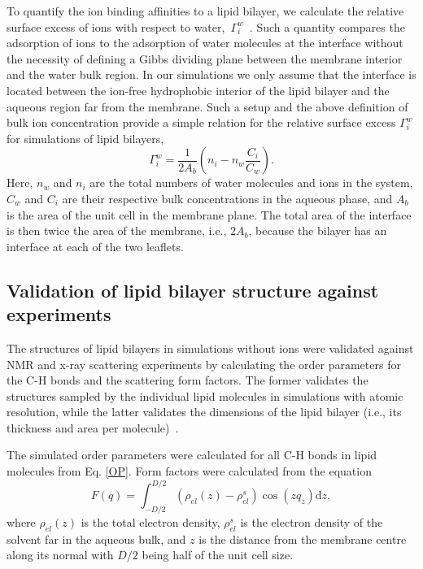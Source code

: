 \documentclass[aip,jcp,twocolumn]{revtex4}
\begin{document}
To quantify the ion binding affinities to a lipid bilayer, we
calculate the relative surface excess of ions with respect to water,~$\Gamma_i^w$~\cite{chattorajBOOK}.
Such a quantity compares the adsorption of ions to the adsorption of water molecules 
at the interface without the necessity of defining a Gibbs dividing plane 
between the membrane interior and the water bulk region. 
In our simulations we only assume that the interface is located between the ion-free hydrophobic interior
of the lipid bilayer and the aqueous region far from the membrane.
Such a setup and the above definition of bulk ion concentration provide a simple relation for the relative surface excess $\Gamma_i^w$ for simulations of lipid bilayers, 
\begin{equation}\label{surfexcess}
  \Gamma_i^w=\frac{1}{2A_b} \left ( n_i - n_w \frac{C_i}{C_w} \right ) .
\end{equation}
Here, $n_w$ and $n_i$ are the total numbers of water molecules and ions in the system,
$C_w$ and $C_i$ are their respective bulk concentrations in the aqueous phase,
and $A_b$ is the area of the unit cell in the membrane plane.
The total area of the interface is then twice the area of the membrane, i.e., $2A_b$,
because the bilayer has an interface at each of the two leaflets.



\subsection{Validation of lipid bilayer structure against experiments}

The structures of lipid bilayers in simulations without ions were validated against NMR and 
\mbox{x-ray} scattering experiments by calculating the order parameters
for the C-H bonds and the scattering form factors. The former validates the structures sampled by the individual
lipid molecules in simulations with atomic resolution, while the latter
validates the dimensions of the lipid bilayer (i.e., its thickness and area per
molecule)~\cite{ollila16}.

The simulated order parameters were calculated for all C-H bonds
in lipid molecules from Eq. \ref{OP}. Form factors were calculated 
from the equation
\begin{equation}
  F(q) = \int _{-D/2} ^{D/2} \left ( \rho_{el}(z) - \rho_{el}^s \right ) \cos (zq_z) \mathrm{d}z,
\end{equation}
where $\rho_{el} (z)$ is the total electron density,
$\rho_{el}^s$ is the electron density of the solvent far in the aqueous bulk,
and $z$ is the distance from the membrane centre along its normal 
with $D/2$ being half of the unit cell size. 
\end{document}
